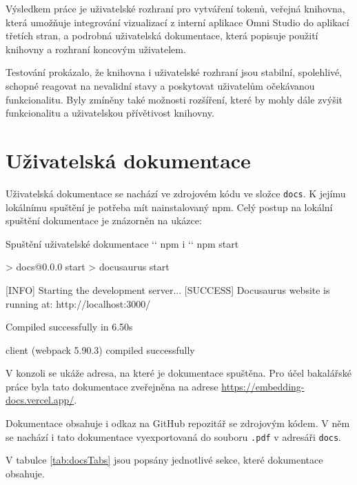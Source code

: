 \documentclass[czech, bc, kiv, he, iso690numb]{fasthesis}
\begin{document}
Výsledkem práce je uživatelské rozhraní pro vytváření tokenů, veřejná knihovna, která umožňuje integrování vizualizací z interní aplikace Omni Studio
do aplikací třetích stran, a podrobná uživatelská dokumentace, která popisuje použití knihovny a rozhraní koncovým uživatelem.

Testování prokázalo, že knihovna i uživatelské rozhraní jsou stabilní, spolehlivé, schopné reagovat na nevalidní stavy a poskytovat uživatelům očekávanou funkcionalitu. Byly zmíněny 
také možnosti rozšíření, které by mohly dále zvýšit funkcionalitu a uživatelskou přívětivost knihovny.


\appendix
\chapter{Uživatelská dokumentace}\label{app:docuDocs}
Uživatelská dokumentace se nachází ve zdrojovém kódu ve složce \texttt{docs}. K jejímu lokálnímu spuštění je potřeba mít nainstalovaný npm.
Celý postup na lokální spuštění dokumentace je znázorněn na ukázce:

\begin{console}{Spuštění uživatelské dokumentace}
`\winprompt` npm i
`\winprompt` npm start

> docs@0.0.0 start
> docusaurus start

[INFO] Starting the development server...
[SUCCESS] Docusaurus website is running at: http://localhost:3000/

 Compiled successfully in 6.50s

client (webpack 5.90.3) compiled successfully
\end{console}

V konzoli se ukáže adresa, na které je dokumentace spuštěna. Pro účel bakalářské práce byla tato dokumentace
zveřejněna na adrese \url{https://embedding-docs.vercel.app/}. 

Dokumentace obsahuje i odkaz na GitHub repozitář se zdrojovým kódem. V něm se nachází i tato dokumentace vyexportovaná do souboru \texttt{.pdf} v adresáři \texttt{docs}. 

V tabulce \ref{tab:docsTabs} jsou popsány jednotlivé sekce, které dokumentace obsahuje.
\end{document}
